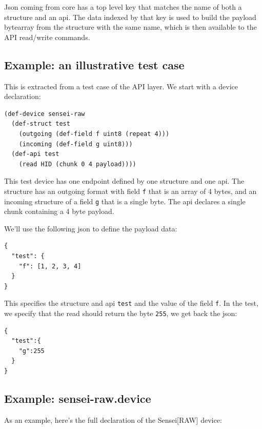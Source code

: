 \documentclass[12pt]{article}
\begin{document}
Json coming from core has a top level key that matches the name of
both a structure and an api. The data indexed by that key is used to
build the payload bytearray from the structure with the same name,
which is then available to the API read/write commands.

\subsection{Example: an illustrative test case}

This is extracted from a test case of the API layer.  We start with a device declaration:

\begin{verbatim}
(def-device sensei-raw 
  (def-struct test 
    (outgoing (def-field f uint8 (repeat 4)))
    (incoming (def-field g uint8)))
  (def-api test
    (read HID (chunk 0 4 payload))))
\end{verbatim}

This test device has one endpoint defined by one structure and one
api. The structure has an outgoing format with field \verb|f| that is
an array of 4 bytes, and an incoming structure of a field \verb|g|
that is a single byte. The api declares a single chunk containing a 4
byte payload.

We'll use the following json to define the payload data:

\begin{verbatim}
{
  "test": {
    "f": [1, 2, 3, 4]
  }
}
\end{verbatim}

This specifies the structure and api \verb|test| and the value of the
field \verb|f|. In the test, we specify that the read should return
the byte \verb|255|, we get back the json:

\begin{verbatim}
{
  "test":{
    "g":255
  }
}
\end{verbatim}

\subsection{Example: sensei-raw.device}

As an example, here's the full declaration of the Sensei[RAW] device:
\end{document}

